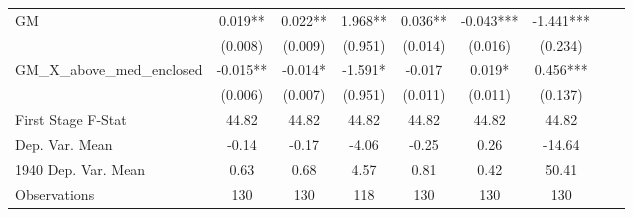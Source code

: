 \begin{tabular}{l*{8}{c}}
\cmidrule(lr){1-7}
GM              &    0.019** &    0.022** &    1.968** &    0.036** &   -0.043***&   -1.441***\\
                &  (0.008)   &  (0.009)   &  (0.951)   &  (0.014)   &  (0.016)   &  (0.234)   \\
\addlinespace
GM\_X\_above\_med\_enclosed&   -0.015** &   -0.014*  &   -1.591*  &   -0.017   &    0.019*  &    0.456***\\
                &  (0.006)   &  (0.007)   &  (0.951)   &  (0.011)   &  (0.011)   &  (0.137)   \\
\midrule
First Stage F-Stat&    44.82   &    44.82   &    44.82   &    44.82   &    44.82   &    44.82   \\
Dep. Var. Mean  &    -0.14   &    -0.17   &    -4.06   &    -0.25   &     0.26   &   -14.64   \\
1940 Dep. Var. Mean&     0.63   &     0.68   &     4.57   &     0.81   &     0.42   &    50.41   \\
Observations    &      130   &      130   &      118   &      130   &      130   &      130   \\
 \bottomrule \end{tabular}
